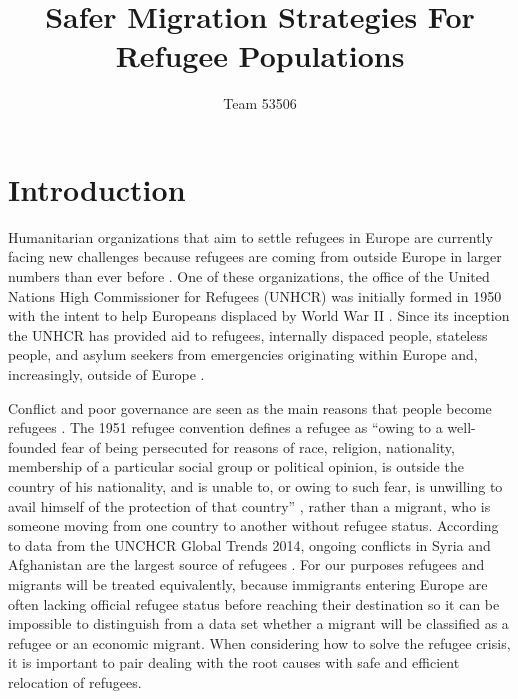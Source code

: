 \documentclass{article}
\title{Safer Migration Strategies For Refugee Populations}
\author{Team 53506}
\begin{document}
\maketitle
\tableofcontents

\maketitle

\newpage


\section{Introduction}

Humanitarian organizations that aim to settle refugees in Europe are currently facing new challenges because refugees are coming from outside Europe in larger numbers than ever before \cite{simpson}. One of these organizations, the office of the United Nations High Commissioner for Refugees (UNHCR) was initially formed in 1950 with the intent to help Europeans displaced by World War II \cite{historyUNHCR}. Since its inception the UNHCR has provided aid to refugees, internally dispaced people, stateless people, and asylum seekers from emergencies originating within Europe and, increasingly, outside of Europe \cite{historyUNHCR}.

Conflict and poor governance are seen as the main reasons that people become refugees \cite{simpson}. The 1951 refugee convention defines a refugee as ``owing to a well-founded fear of being persecuted for reasons of race, religion, nationality, membership of a particular social group or political opinion, is outside the country of his nationality, and is unable to, or owing to such fear, is unwilling to avail himself of the protection of that country'' \cite{1951convention}, rather than a migrant, who is someone moving from one country to another without refugee status. According to data from the UNCHCR Global Trends 2014, ongoing conflicts in Syria and Afghanistan are the largest source of refugees \cite{refugeefactsheet}. For our purposes refugees and migrants will be treated equivalently, because immigrants entering Europe are often lacking official refugee status before reaching their destination so it can be impossible to distinguish from a data set whether a migrant will be classified as a refugee or an economic migrant. When considering how to solve the refugee crisis, it is important to pair dealing with the root causes with safe and efficient relocation of refugees.
\end{document}
